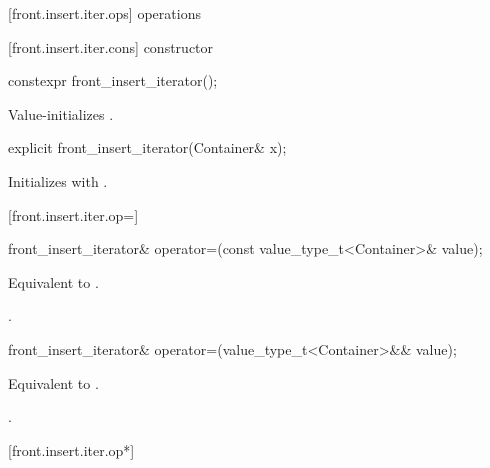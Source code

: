 [front.insert.iter.ops]{ operations}

[front.insert.iter.cons]{ constructor}

%
\begin{itemdecl}
constexpr front_insert_iterator();
\end{itemdecl}

\begin{itemdescr}
\pnum
\effects
Value-initializes
.
\end{itemdescr}

%
\begin{itemdecl}
explicit front_insert_iterator(Container& x);
\end{itemdecl}

\begin{itemdescr}
\pnum
\effects
Initializes
with .
\end{itemdescr}

[front.insert.iter.op=]{}

%
\begin{itemdecl}
front_insert_iterator&
  operator=(const value_type_t<Container>& value);
\end{itemdecl}

\begin{itemdescr}
\pnum
\effects Equivalent to
.

\pnum
\returns
{}.
\end{itemdescr}

%
\begin{itemdecl}
front_insert_iterator&
  operator=(value_type_t<Container>&& value);
\end{itemdecl}

\begin{itemdescr}
\pnum
\effects Equivalent to
.

\pnum
\returns
{}.
\end{itemdescr}

[front.insert.iter.op*]{}

